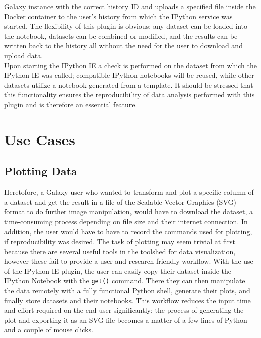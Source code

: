 \documentclass{bioinfo}
\begin{document}
\begin{methods}
Galaxy instance with the correct history ID and uploads a specified file inside the Docker container to the user's
history from which the IPython service was started. The flexibility of this plugin is obvious: any dataset can be
loaded into the notebook, datasets can be combined or modified, and the results can be written back to the history
all without the need for the user to download and upload data. \\
Upon starting the IPython IE a check is performed on the dataset from which the IPython IE was called; compatible IPython
notebooks will be reused, while other datasets utilize a notebook generated from a template. It should be stressed that
this functionality ensures the reproducibility of data analysis performed with this plugin and is therefore an essential
feature.


\section{Use Cases}
\subsection{Plotting Data}
Heretofore, a Galaxy user who wanted to transform and plot a specific column of a dataset and
get the result in a file of the Scalable Vector Graphics (SVG) format to do further image manipulation,
would have to download the dataset, a time-consuming process depending on file size and their internet
connection. In addition, the user would have to have to record the commands used for plotting, if reproducibility was desired.
The task of plotting may seem trivial at first because there are several useful tools in the toolshed for data visualization,
however these fail to provide a user and research friendly workflow. With the use of the IPython IE plugin, the user
can easily copy their dataset inside the IPython Notebook with the \texttt{get()} command. There they can then manipulate the
data remotely with a fully functional Python shell, generate their plots, and finally store datasets and their notebooks.
This workflow reduces the input time and effort required on the end user significantly; the process of generating the plot
and exporting it as an SVG file becomes a matter of a few lines of Python and a couple of mouse clicks.


\end{methods}
\end{document}
